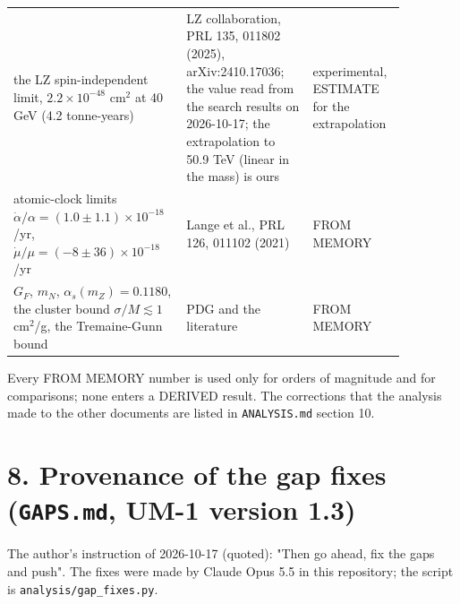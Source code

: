 \documentclass[11pt]{article}
\begin{document}
\begin{longtable}{>{\raggedright\arraybackslash}p{0.333\linewidth}>{\raggedright\arraybackslash}p{0.309\linewidth}>{\raggedright\arraybackslash}p{0.227\linewidth}}
the LZ spin-independent limit, $2.2\times10^{-48}$ cm$^2$ at 40 GeV (4.2 tonne-years) & LZ collaboration, PRL 135, 011802 (2025), arXiv:2410.17036; the value read from the search results on 2026-10-17; the extrapolation to 50.9 TeV (linear in the mass) is ours & experimental, ESTIMATE for the extrapolation \\
atomic-clock limits $\dot\alpha/\alpha = (1.0\pm1.1)\times10^{-18}$/yr, $\dot\mu/\mu = (-8\pm36)\times10^{-18}$/yr & Lange et al., PRL 126, 011102 (2021) & FROM MEMORY \\
$G_F$, $m_N$, $\alpha_s(m_Z) = 0.1180$, the cluster bound $\sigma/M \lesssim 1$ cm$^2$/g, the Tremaine-Gunn bound & PDG and the literature & FROM MEMORY \\
\bottomrule
\end{longtable}

Every FROM MEMORY number is used only for orders of magnitude and for comparisons; none enters a DERIVED result. The corrections that the analysis made to the other documents are listed in \texttt{ANALYSIS.\allowbreak{}md} section 10.

\section*{8. Provenance of the gap fixes (\texttt{GAPS.\allowbreak{}md}, UM-1 version 1.3)}

The author's instruction of 2026-10-17 (quoted): "Then go ahead, fix the gaps and push". The fixes were made by Claude Opus 5.5 in this repository; the script is \texttt{analysis/\allowbreak{}gap\_\allowbreak{}fixes.\allowbreak{}py}.
\end{document}
